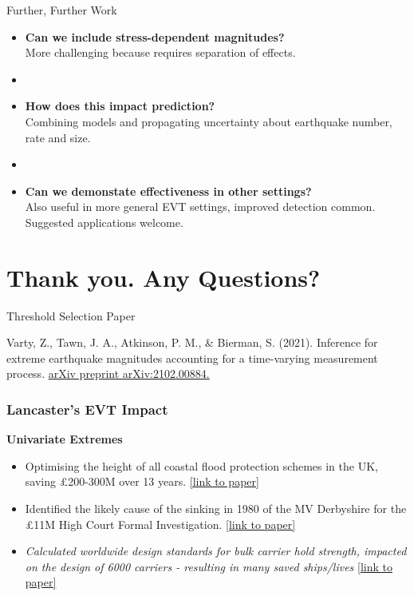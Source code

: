 \begin{frame}{Further, Further Work}
    \begin{itemize}
        \item \textbf{Can we include stress-dependent magnitudes?} \\ More challenging because requires separation of effects. 
        \item []
        \item \textbf{How does this impact prediction?} \\ Combining models and propagating uncertainty about earthquake number, rate and size. 
        \item []
        \item \textbf{Can we demonstate effectiveness  in other settings?} \\ Also useful in more general EVT settings, improved detection common. Suggested applications welcome.
    \end{itemize}
\end{frame}

\section{Thank you. Any Questions?}

\appendix

\begin{frame}{Threshold Selection Paper}

Varty, Z., Tawn, J. A., Atkinson, P. M., \& Bierman, S. (2021). Inference for extreme earthquake magnitudes accounting for a time-varying measurement process. \href{https://arxiv.org/abs/2102.00884}{arXiv preprint arXiv:2102.00884.}

\end{frame}


\begin{frame}
\frametitle{Lancaster’s EVT Impact}
{\bf Univariate Extremes}

\begin{itemize}

\item Optimising the height of all coastal flood protection schemes in the UK, saving \pounds 200-300M over 13 years. \href{https://rss.onlinelibrary.wiley.com/doi/abs/10.2307/2347619}{[link to paper]}

\item Identified the likely cause of the sinking in 1980 of the MV Derbyshire for the \pounds 11M High Court Formal Investigation.
\href{https://rss.onlinelibrary.wiley.com/doi/full/10.1111/1467-9876.00408}{[link to paper]}

\item {\it Calculated worldwide design standards for bulk carrier hold strength, impacted on the design of 6000 carriers - resulting in many saved ships/lives} 
\href{https://link.springer.com/article/10.1023/A:1016544112941}{[link to paper]}
\end{itemize}
\end{frame} 

